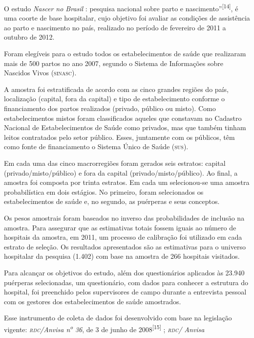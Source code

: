\documentclass{article}
\begin{document}
O estudo \textit{Nascer no Brasil}
: pesquisa nacional sobre parto e
nascimento”\textsuperscript{[}\textsuperscript{14}\textsuperscript{]}, é uma coorte de
base hospitalar, cujo objetivo foi avaliar as condições de assistência ao parto
e
nascimento no país, realizado no período de fevereiro de 2011 a outubro de 2012.

Foram elegíveis para o estudo todos os estabelecimentos de saúde que realizaram
mais
de 500 partos no ano 2007, segundo o Sistema de Informações sobre Nascidos Vivos
(\textsc{sinasc}).

A amostra foi estratificada de acordo com as cinco grandes regiões do país,
localização (capital, fora da capital) e tipo de estabelecimento conforme o
financiamento dos partos realizados (privado, público ou misto). Como
estabelecimentos mistos foram classificados aqueles que constavam no Cadastro
Nacional de Estabelecimentos de Saúde como privados, mas que também tinham
leitos
contratados pelo setor público. Esses, juntamente com os públicos, têm como
fonte de
financiamento o Sistema Único de Saúde (\textsc{sus}).

Em cada uma das cinco macrorregiões foram gerados seis estratos: capital
(privado/misto/público) e fora da capital (privado/misto/público). Ao final, a
amostra foi composta por trinta estratos. Em cada um selecionou-se uma amostra
probabilística em dois estágios. No primeiro, foram selecionados os
estabelecimentos
de saúde e, no segundo, as puérperas e seus conceptos.

Os pesos amostrais foram baseados no inverso das probabilidades de inclusão na
amostra. Para assegurar que as estimativas totais fossem iguais ao número de
hospitais da amostra, em 2011, um processo de calibração foi utilizado em cada
estrato de seleção. Os resultados apresentados são as estimativas para o
universo
hospitalar da pesquisa (1.402) com base na amostra de 266 hospitais visitados.

Para alcançar os objetivos do estudo, além dos questionários aplicados às 23.940
puérperas selecionadas, um questionário, com dados para conhecer a estrutura do
hospital, foi preenchido pelos supervisores de campo durante a entrevista
pessoal
com os gestores dos estabelecimentos de saúde amostrados.

Esse instrumento de coleta de dados foi desenvolvido com base na legislação
vigente:
\textit{\textsc{rdc}/Anvisa
n}\textsuperscript{\textit{o}}
\textit{
36}, de 3 de junho de 2008\textsuperscript{[}\textsuperscript{15}\textsuperscript{]}
; \textit{\textsc{rdc}/ Anvisa}
\end{document}
